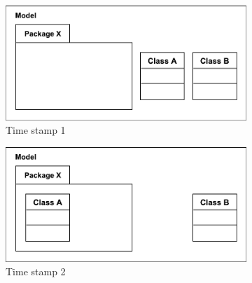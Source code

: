 \documentclass{llncs}
\begin{document}
\begin{figure}[ht]
    \begin{subfigure}[t]{0.329\linewidth}
        \centering
        \includegraphics[width=\linewidth]{images/illustration_3}
        \caption{Time stamp 1}
        \label{fig:illustration_3}
    \end{subfigure}
    \begin{subfigure}[t]{0.329\linewidth}
        \centering
        \includegraphics[width=\linewidth]{images/illustration_4}
        \caption{Time stamp 2}
        \label{fig:illustration_4}
    \end{subfigure}
    \begin{subfigure}[t]{0.329\linewidth}
        \centering

\end{subfigure}
\end{figure}
\end{document}
